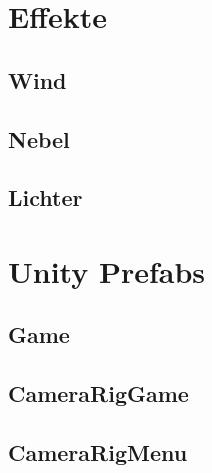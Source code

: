 \section{Effekte}\label{sec:effects}
\subsection{Wind}\label{subsec:wind-effect}
\subsection{Nebel}\label{subsec:fog-effect}
\subsection{Lichter}\label{subsec:light-effect}
\section{Unity Prefabs}\label{sec:prefabs}
\subsection{Game}\label{subsec:game-prefab}
\subsection{CameraRigGame}\label{subsec:camera-rig-game-prefab}
\subsection{CameraRigMenu}\label{subsec:camera-rig-menu-prefab}
